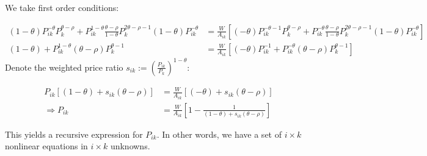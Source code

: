 \documentclass[11pt]{article} %
\begin{document}
We take first order conditions:

\begin{align*}
(1-\theta)P_{ik}^{-\theta}P_k^{\theta - \rho} + P_{ik}^{1-\theta} \frac{\theta - \rho}{1-\theta}P_k^{2\theta - \rho - 1}(1-\theta)P_{ik}^{-\theta} &= \frac{W}{A_{ik}}\left[ (-\theta)P_{ik}^{-\theta-1}P_k^{\theta-\rho} + P_{ik}^{-\theta} \frac{\theta - \rho}{1-\theta} P_k^{2\theta - \rho - 1}(1-\theta)P_{ik}^{-\theta}\right]\\
(1-\theta) + P_{ik}^{1-\theta} (\theta - \rho)P_k^{\theta  - 1} &= \frac{W}{A_{ik}}\left[ (-\theta)P_{ik}^{-1} + P_{ik}^{-\theta} (\theta - \rho) P_k^{\theta - 1}\right]
\end{align*}
Denote the weighted price ratio $s_{ik}:= \left(\frac{P_{ik}}{P_{k}}\right)^{1-\theta}$:

\begin{align*}
P_{ik}[(1-\theta) +  s_{ik} (\theta - \rho)]&= \frac{W}{A_{ik}}\left[ (-\theta) + s_{ik} (\theta - \rho) \right]\\
\Rightarrow P_{ik} &= \frac{W}{A_{ik}}\left[ 1 - \frac{1}{(1-\theta) +  s_{ik} (\theta - \rho)} \right]
\end{align*}

This yields a recursive expression for $P_{ik}$. In other words, we have a set of $i \times k$ nonlinear equations in $i \times k$ unknowns.
\end{document}
